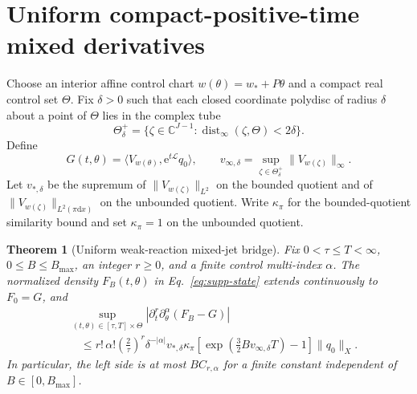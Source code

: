 \documentclass[aps,physrev,onecolumn,amsmath,amssymb,longbibliography]{revtex4-2}
\newcommand{\dd}{\mathrm d}
\newcommand{\e}{\mathrm e}
\newcommand{\Lfree}{\mathcal L}
\newtheorem{theorem}{Theorem}[section]
\begin{document}
\section{Uniform compact-positive-time mixed derivatives}
\label{sec:supp-mixed}

Choose an interior affine control chart \(w(\theta)=w_*+P\theta\) and a
compact real control set \(\Theta\).  Fix \(\delta>0\) such that each closed
coordinate polydisc of radius \(\delta\) about a point of \(\Theta\) lies in
the complex tube
\begin{equation}
 \Theta_\delta^+
 =\{\zeta\in\mathbb C^{J-1}:
   \operatorname{dist}_\infty(\zeta,\Theta)<2\delta\}.
 \label{eq:supp-tube}
\end{equation}
Define
\begin{equation}
 G(t,\theta)=\langle V_{w(\theta)},\e^{t\Lfree}q_0\rangle,\qquad
 v_{\infty,\delta}=
 \sup_{\zeta\in\Theta_\delta^+}\|V_{w(\zeta)}\|_\infty .
 \label{eq:supp-free-exposure}
\end{equation}
Let \(v_{*,\delta}\) be the supremum of
\(\|V_{w(\zeta)}\|_{L^2}\) on the bounded quotient and of
\(\|V_{w(\zeta)}\|_{L^2(\pi\dd x)}\) on the unbounded quotient.  Write
\(\kappa_\pi\) for the bounded-quotient similarity bound and set
\(\kappa_\pi=1\) on the unbounded quotient.

\begin{theorem}[Uniform weak-reaction mixed-jet bridge]
\label{thm:mixed-jet}
Fix \(0<\tau\le T<\infty\), \(0\le B\le B_{\max}\), an integer \(r\ge0\),
and a finite control multi-index \(\alpha\).  The normalized density
\(F_B(t,\theta)\) in Eq.~\eqref{eq:supp-state} extends continuously to
\(F_0=G\), and
\begin{align}
 &\sup_{(t,\theta)\in[\tau,T]\times\Theta}
 \left|\partial_t^r\partial_\theta^\alpha(F_B-G)\right|
 \nonumber\\
 &\quad\le
 r!\,\alpha!\left(\frac2\tau\right)^r
 \delta^{-|\alpha|}v_{*,\delta}\kappa_\pi
 \left[\exp\!\left(\frac32Bv_{\infty,\delta}T\right)-1\right]
 \|q_0\|_X .
 \label{eq:supp-mixed-bound}
\end{align}
In particular, the left side is at most \(BC_{r,\alpha}\) for a finite
constant independent of \(B\in[0,B_{\max}]\).
\end{theorem}
\end{document}
